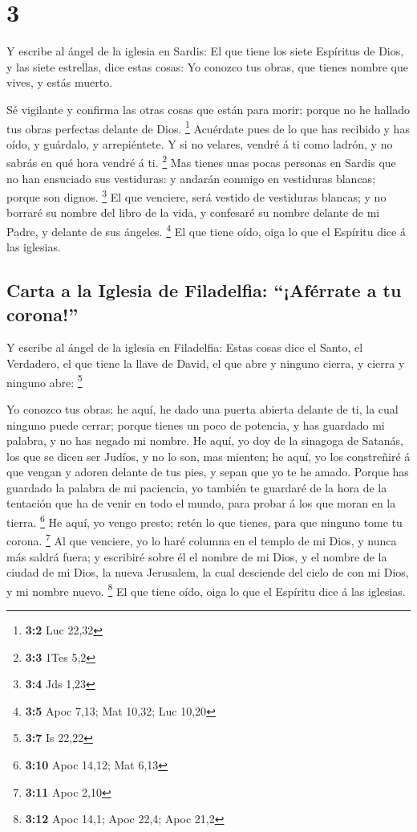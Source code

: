\hypertarget{section-2}{%
\section{3}\label{section-2}}

 Y escribe al ángel de la iglesia en Sardis: El que tiene
los siete Espíritus de Dios, y las siete estrellas, dice estas cosas: Yo
conozco tus obras, que tienes nombre que vives, y estás muerto.

 Sé vigilante y confirma las otras cosas que están para
morir; porque no he hallado tus obras perfectas delante de Dios.
\footnote{\textbf{3:2} Luc 22,32}  Acuérdate pues de lo que
has recibido y has oído, y guárdalo, y arrepiéntete. Y si no velares,
vendré á ti como ladrón, y no sabrás en qué hora vendré á ti.
\footnote{\textbf{3:3} 1Tes 5,2}  Mas tienes unas pocas
personas en Sardis que no han ensuciado sus vestiduras: y andarán
conmigo en vestiduras blancas; porque son dignos. \footnote{\textbf{3:4}
  Jds 1,23}  El que venciere, será vestido de vestiduras
blancas; y no borraré su nombre del libro de la vida, y confesaré su
nombre delante de mi Padre, y delante de sus ángeles. \footnote{\textbf{3:5}
  Apoc 7,13; Mat 10,32; Luc 10,20}  El que tiene oído, oiga
lo que el Espíritu dice á las iglesias.

\hypertarget{carta-a-la-iglesia-de-filadelfia-afuxe9rrate-a-tu-corona}{%
\subsection{Carta a la Iglesia de Filadelfia: ``¡Aférrate a tu
corona!''}\label{carta-a-la-iglesia-de-filadelfia-afuxe9rrate-a-tu-corona}}

 Y escribe al ángel de la iglesia en Filadelfia: Estas cosas
dice el Santo, el Verdadero, el que tiene la llave de David, el que abre
y ninguno cierra, y cierra y ninguno abre: \footnote{\textbf{3:7} Is
  22,22}

 Yo conozco tus obras: he aquí, he dado una puerta abierta
delante de ti, la cual ninguno puede cerrar; porque tienes un poco de
potencia, y has guardado mi palabra, y no has negado mi nombre.
 He aquí, yo doy de la sinagoga de Satanás, los que se dicen
ser Judíos, y no lo son, mas mienten; he aquí, yo los constreñiré á que
vengan y adoren delante de tus pies, y sepan que yo te he amado.
 Porque has guardado la palabra de mi paciencia, yo también
te guardaré de la hora de la tentación que ha de venir en todo el mundo,
para probar á los que moran en la tierra. \footnote{\textbf{3:10} Apoc
  14,12; Mat 6,13}  He aquí, yo vengo presto; retén lo que
tienes, para que ninguno tome tu corona. \footnote{\textbf{3:11} Apoc
  2,10}  Al que venciere, yo lo haré columna en el templo
de mi Dios, y nunca más saldrá fuera; y escribiré sobre él el nombre de
mi Dios, y el nombre de la ciudad de mi Dios, la nueva Jerusalem, la
cual desciende del cielo de con mi Dios, y mi nombre nuevo. \footnote{\textbf{3:12}
  Apoc 14,1; Apoc 22,4; Apoc 21,2}  El que tiene oído, oiga
lo que el Espíritu dice á las iglesias.

